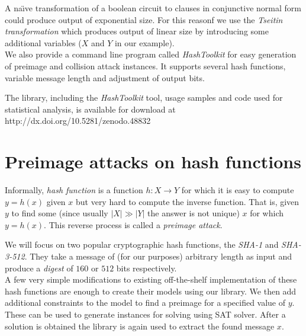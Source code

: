 \documentclass[myposter,portrait]{sciposter}
\def\mysection#1{
{\color{sectionCol}\section*{\sc\bfseries #1}}}
\begin{document}
\begin{multicols*}{3}
\begin{center}
  
\end{center}

A na\"{\i}ve transformation of a boolean circuit to clauses in conjunctive normal form could produce output of exponential size.
For this reasonf   we use the \emph{Tseitin transformation} \cite{tseitin1983complexity} which produces output of linear size by introducing some additional variables ($X$ and $Y$ in our example).
~\\

We also provide a command line program called \emph{HashToolkit} for easy generation of preimage and collision attack instances.
It supports several hash functions, variable message length and adjustment of output bits.
~\\

\vfill

\begin{minipage}[t][][b]{.59\columnwidth}
The library, including the \emph{HashToolkit} tool, usage samples and code used for statistical analysis, is available for download at http://dx.doi.org/10.5281/zenodo.48832
\end{minipage}
\begin{minipage}[t][][t]{.4\columnwidth}
\hfill {}
\end{minipage}

\columnbreak
\mysection{Preimage attacks on hash functions}
Informally, \emph{hash function} is a function $h: X \to Y$ for which it is easy to compute $y = h(x)$ given $x$ but very hard to compute the inverse function.
That is, given $y$ to find some (since usually $|X| \gg |Y|$ the answer is not unique) $x$ for which $y = h(x)$.
This reverse process is called a \emph{preimage attack}.

We will focus on two popular cryptographic hash functions, the \emph{SHA-1} and \emph{SHA-3-512}.
They take a message of (for our purposes) arbitrary length as input and produce a \emph{digest} of $160$ or $512$ bits respectively.
~\\

A few very simple modifications to existing off-the-shelf implementation of these hash functions are enough to create their models using our library.
We then add additional constraints to the model to find a preimage for a specified value of $y$.
These can be used to generate instances for solving using SAT solver.
After a solution is obtained the library is again used to extract the found message $x$.


\end{multicols*}
\end{document}
